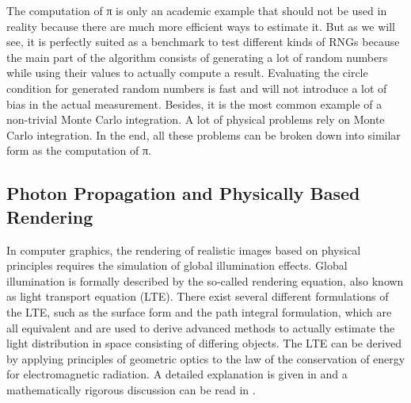 \documentclass{stdlocal}
\begin{document}

    The computation of π is only an academic example that should not be used in reality because there are much more efficient ways to estimate it.
    But as we will see, it is perfectly suited as a benchmark to test different kinds of RNGs because the main part of the algorithm consists of generating a lot of random numbers while using their values to actually compute a result.
    Evaluating the circle condition for generated random numbers is fast and will not introduce a lot of bias in the actual measurement.
    Besides, it is the most common example of a non-trivial Monte Carlo integration.
    A lot of physical problems rely on Monte Carlo integration.
    In the end, all these problems can be broken down into similar form as the computation of π.



  \subsection{Photon Propagation and Physically Based Rendering} %
  \label{sub:photon_propagation_and_physically_based_rendering}
    In computer graphics, the rendering of realistic images based on physical principles requires the simulation of global illumination effects.
    Global illumination is formally described by the so-called rendering equation, also known as light transport equation (LTE).
    There exist several different formulations of the LTE, such as the surface form and the path integral formulation, which are all equivalent and are used to derive advanced methods to actually estimate the light distribution in space consisting of differing objects.
    The LTE can be derived by applying principles of geometric optics to the law of the conservation of energy for electromagnetic radiation.
    A detailed explanation is given in \textcite{pharr2016} and a mathematically rigorous discussion can be read in \textcite{pawellek2017}.
\end{document}
